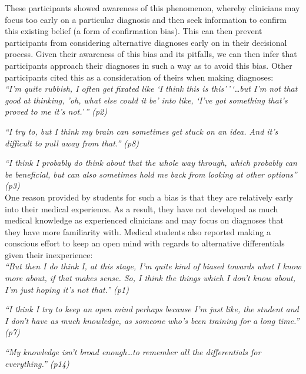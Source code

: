 \documentclass[a4paper, nobind]{templates/ociamthesis}
\begin{document}
These participants showed awareness of this phenomenon, whereby clinicians may focus too early on a particular diagnosis and then seek information to confirm this existing belief (a form of confirmation bias). This can then prevent participants from considering alternative diagnoses early on in their decisional process. Given their awareness of this bias and its pitfalls, we can then infer that participants approach their diagnoses in such a way as to avoid this bias. Other participants cited this as a consideration of theirs when making diagnoses:\\

\emph{``I'm quite rubbish, I often get fixated like `I think this is this'\,'\,`\ldots but I'm not that good at thinking, 'oh, what else could it be' into like, `I've got something that's proved to me it's not.'\,'' (p2)}

\emph{``I try to, but I think my brain can sometimes get stuck on an idea. And it's difficult to pull away from that.'' (p8)}

\emph{``I think I probably do think about that the whole way through, which probably can be beneficial, but can also sometimes hold me back from looking at other options'' (p3)}\\

One reason provided by students for such a bias is that they are relatively early into their medical experience. As a result, they have not developed as much medical knowledge as experienced clinicians and may focus on diagnoses that they have more familiarity with. Medical students also reported making a conscious effort to keep an open mind with regards to alternative differentials given their inexperience:\\

\emph{``But then I do think I, at this stage, I'm quite kind of biased towards what I know more about, if that makes sense. So, I think the things which I don't know about, I'm just hoping it's not that.'' (p1)}

\emph{``I think I try to keep an open mind perhaps because I'm just like, the student and I don't have as much knowledge, as someone who's been training for a long time.'' (p7)}

\emph{``My knowledge isn't broad enough\ldots to remember all the differentials for everything.'' (p14)}
\end{document}
